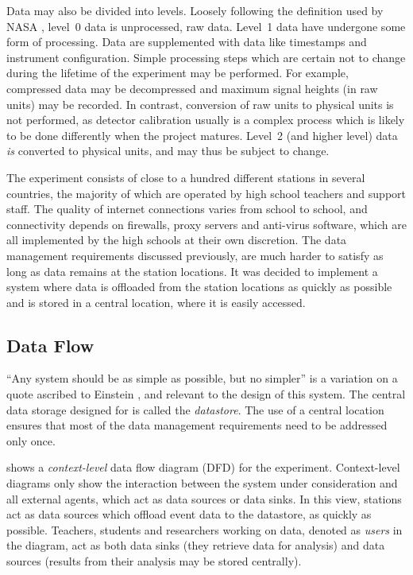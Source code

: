 Data may also be divided into levels.  Loosely following the definition used by
NASA \cite[5]{NASA:1986}, level~0 data is unprocessed, raw data.  Level~1 data
have undergone some form of processing.  Data are supplemented with data like
timestamps and instrument configuration.  Simple processing steps which are
certain not to change during the lifetime of the experiment may be performed.
For example, compressed data may be decompressed and maximum signal heights (in
raw units) may be recorded.  In contrast, conversion of raw units to physical
units is not performed, as detector calibration usually is a complex process
which is likely to be done differently when the project matures.  Level~2 (and
higher level) data \emph{is} converted to physical units, and may thus be
subject to change.

The \hisparc experiment consists of close to a hundred different stations in
several countries, the majority of which are operated by high school teachers
and support staff.  The quality of internet connections varies from school to
school, and connectivity depends on firewalls, proxy servers and anti-virus
software, which are all implemented by the high schools at their own
discretion.  The data management requirements discussed previously, are much
harder to satisfy as long as data remains at the station locations.  It was
decided to implement a system where data is offloaded from the station locations
as quickly as possible and is stored in a central location, where it is easily
accessed.


\subsection{Data Flow}

``Any system should be as simple as possible, but no simpler'' is a variation on
a quote ascribed to Einstein \cite{Einstein:simple}, and relevant to the design
of this system.  The central data storage designed for \hisparc is
called the \emph{datastore}.  The use of a central location ensures that most of
the data management requirements need to be addressed only once.

 shows a \emph{context-level} data flow diagram
(DFD) for the \hisparc experiment.  Context-level diagrams only show the
interaction between the system under consideration and all external agents,
which act as data sources or data sinks.  In this view, stations act as data
sources which offload event data to the datastore, as quickly as possible.
Teachers, students and researchers working on \hisparc data, denoted as
\emph{users} in the diagram, act as both data sinks (they retrieve data for
analysis) and data sources (results from their analysis may be stored
centrally).

